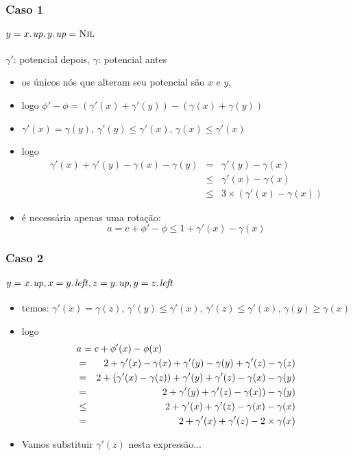 \documentclass{beamer}
\begin{document}
\begin{frame}
\frametitle{Caso 1}
\framesubtitle{$y = \attrib{x}{up}, \attrib{y}{up} = \const{Nil}$}

$\gamma'$: potencial depois, $\gamma$: potencial antes

\begin{itemize}
\item os únicos nós que alteram seu potencial são $x$ e $y$,
\item logo $\phi' - \phi = (\gamma'(x)+\gamma'(y))-(\gamma(x)+\gamma(y))$
\item $\gamma'(x) = \gamma(y)$, $\gamma'(y) \le \gamma'(x)$, $\gamma(x) \le \gamma'(x)$
\item logo 
\begin{eqnarray*}
\gamma'(x) + \gamma'(y) - \gamma(x) - \gamma(y) & = & \gamma'(y) - \gamma(x) \\
& \le & \gamma'(x) - \gamma(x) \\
& \le & 3 \times(\gamma'(x) - \gamma(x))
\end{eqnarray*}
\item é necessária apenas uma rotação:
$$a = c + \phi'- \phi \le 1 + \gamma'(x) - \gamma(x)$$
\end{itemize}
\end{frame}

\begin{frame}
\frametitle{Caso 2}
\framesubtitle{$y = \attrib{x}{up}, x = \attrib{y}{left}, z = \attrib{y}{up}, y = \attrib{z}{left}$}

\begin{itemize}
\item temos: $\gamma'(x) = \gamma(z)$, $\gamma'(y) \le \gamma'(x)$,
$\gamma'(z) \le \gamma'(x)$, $\gamma(y) \ge \gamma(x)$
\item logo 
\begin{eqnarray*}
\lefteqn{a = c + \phi'(x) - \phi(x)} \\
& = & 2 + \gamma'(x) - \gamma(x) + \gamma'(y) - \gamma(y) + \gamma'(z) - \gamma(z) \\
 & = & 2 + (\gamma'(x) - \gamma(z)) + \gamma'(y) + \gamma'(z) - \gamma(x) - \gamma(y) \\
& = & 2 + \gamma'(y) + \gamma'(z) - \gamma(x)) - \gamma(y) \\
& \le & 2 + \gamma'(x) + \gamma'(z) - \gamma(x) - \gamma(x) \\
& = & 2 + \gamma'(x) + \gamma'(z) - 2 \times \gamma(x)
\end{eqnarray*}
\item Vamos substituir $\gamma'(z)$ nesta expressão...
\end{itemize}
\end{frame}
\end{document}

